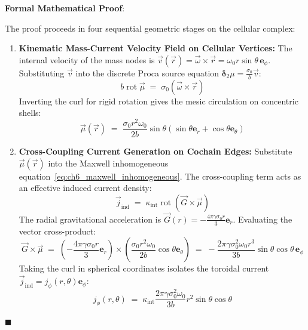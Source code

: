 \documentclass[
    12pt,
    a4paper,
    headings=normal,
    twoside=false,
    open=any,
    parskip=half
]{scrbook}
\newenvironment{myproof}[1][]{%
  \par\vspace{6pt}\noindent\textbf{\sffamily\color{maincolor}Formal Mathematical Proof\ifstrempty{#1}{}{ (#1)}}:\par\nopagebreak
}{%
  \penalty50\hfill\ensuremath{\blacksquare}\par\vspace{6pt}
}
\begin{document}
\begin{myproof}
The proof proceeds in four sequential geometric stages on the cellular complex:
\begin{enumerate}[label=\textbf{Stage \arabic*:}, leftmargin=2.2em]
    \item \textbf{Kinematic Mass-Current Velocity Field on Cellular Vertices:}  
    The internal velocity of the mass nodes is $\vec{v}(\vec{r}) = \vec{\omega} \times \vec{r} = \omega_0 r \sin\theta \, \mathbf{e}_\phi$. Substituting $\vec{v}$ into the discrete Proca source equation $\boldsymbol{\delta}_2 \mu = \frac{\sigma_0}{b} \vec{v}$:
    \begin{equation*}
    b \operatorname{rot}\vec{\mu} \;=\; \sigma_0 \left( \vec{\omega} \times \vec{r} \right)
    \end{equation*}
    Inverting the curl for rigid rotation gives the mesic circulation on concentric shells:
    \begin{equation*}
    \vec{\mu}(\vec{r}) \;=\; \frac{\sigma_0 r^2 \omega_0}{2b} \sin\theta \left( \sin\theta \mathbf{e}_r + \cos\theta \mathbf{e}_\theta \right)
    \end{equation*}

    \item \textbf{Cross-Coupling Current Generation on Cochain Edges:}  
    Substitute $\vec{\mu}(\vec{r})$ into the Maxwell inhomogeneous equation~\eqref{eq:ch6_maxwell_inhomogeneous}. The cross-coupling term acts as an effective induced current density:
    \begin{equation*}
    \vec{j}_{\text{ind}} \;=\; \kappa_{\text{int}} \operatorname{rot}\left( \vec{G} \times \vec{\mu} \right)
    \end{equation*}
    The radial gravitational acceleration is $\vec{G}(r) = -\frac{4\pi\gamma\sigma_0 r}{3}\mathbf{e}_r$. Evaluating the vector cross-product:
    \begin{equation*}
    \vec{G} \times \vec{\mu} \;=\; \left( -\frac{4\pi\gamma\sigma_0 r}{3}\mathbf{e}_r \right) \times \left( \frac{\sigma_0 r^2 \omega_0}{2b} \cos\theta \mathbf{e}_\theta \right) \;=\; -\frac{2\pi\gamma\sigma_0^2 \omega_0 r^3}{3b} \sin\theta\cos\theta \, \mathbf{e}_\phi
    \end{equation*}
    Taking the curl in spherical coordinates isolates the toroidal current $\vec{j}_{\text{ind}} = j_\phi(r, \theta) \mathbf{e}_\phi$:
    \begin{equation*}
    j_\phi(r, \theta) \;=\; \kappa_{\text{int}} \frac{2\pi\gamma\sigma_0^2 \omega_0}{3b} r^2 \sin\theta \cos\theta
    \end{equation*}


\end{enumerate}
\end{myproof}
\end{document}
